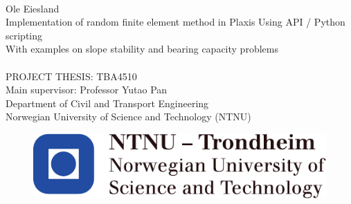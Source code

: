 \thispagestyle{empty}
\mbox{}\\[6pc]

\noindent\Large{Ole Eiesland}\\[4pc]
\Huge{Implementation of random finite element method in Plaxis Using API / Python scripting}\\[1pc]
\Large{With examples on slope stability and bearing capacity problems}\\[5pc]
\\[2pc]
PROJECT THESIS: TBA4510\\
\large{Main supervisor: Professor Yutao Pan}\\
Department of Civil and Transport Engineering\\
Norwegian University of Science and Technology (NTNU)
\begin{figure}[b!]
   \includegraphics[scale=1.0]{fig/NTNU}
\end{figure}

\vfill



